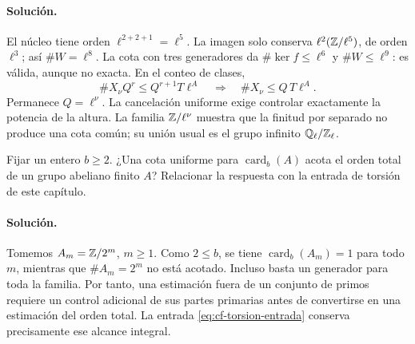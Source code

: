 \paragraph{Solución.}
El núcleo tiene orden $\ell^{2+2+1}=\ell^5$.
La imagen solo conserva $\ell^2(\mathbb{Z}/\ell^5)$, de orden
$\ell^3$; así $\#W=\ell^8$.
La cota con tres generadores da
$\#\ker f\le\ell^6$ y $\#W\le\ell^9$:
es válida, aunque no exacta.
En el conteo de clases,
\[
 \#X_\nu Q^r\le Q^{r+1}T\ell^A
 \quad\Longrightarrow\quad
 \#X_\nu\le Q\,T\ell^A.
\]
Permanece $Q=\ell^\nu$. La cancelación uniforme exige
controlar exactamente la potencia de la altura.
La familia $\mathbb{Z}/\ell^\nu$ muestra que la finitud por
separado no produce una cota común; su unión usual es
el grupo infinito $\mathbb{Q}_\ell/\mathbb{Z}_\ell$.

\begin{ejercicio}
Fijar un entero $b\ge2$. ¿Una cota uniforme para
$\operatorname{card}_b(A)$ acota el orden total de
un grupo abeliano finito $A$? Relacionar la respuesta
con la entrada de torsión de este capítulo.
\end{ejercicio}

\paragraph{Solución.}
Tomemos $A_m=\mathbb{Z}/2^m$, $m\ge1$.
Como $2\le b$, se tiene $\operatorname{card}_b(A_m)=1$
para todo $m$, mientras que $\#A_m=2^m$ no está acotado.
Incluso basta un generador para toda la familia.
Por tanto, una estimación fuera de un conjunto de primos
requiere un control adicional de sus partes primarias
antes de convertirse en una estimación del orden total.
La entrada \eqref{eq:cf-torsion-entrada} conserva precisamente
ese alcance integral.

